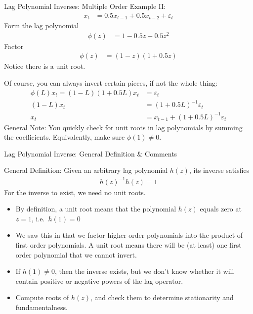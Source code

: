 \documentclass[aspectratio=169, handout]{beamer}
\begin{document}
{\footnotesize
\begin{frame}{Lag Polynomial Inverses: Multiple Order}
Example II:
\begin{align*}
  x_t
  &= 0.5x_{t-1} + 0.5x_{t-2} + \varepsilon_t
\end{align*}
Form the lag polynomial
\begin{align*}
  \phi(z)
  &= 1 - 0.5z -0.5z^2
\end{align*}
\pause
Factor
\begin{align*}
  \phi(z)
  &= (1-z)(1+0.5z)
\end{align*}
Notice there is a unit root.

\pause
Of course, you can always invert certain pieces, if not the whole thing:
\begin{align*}
  \phi(L)x_t
  =
  (1-L)(1+0.5L)
  x_t
  &=
  \varepsilon_t
  \\
  (1-L)x_t &= (1+0.5L)^{-1}\varepsilon_t
  \\
  x_t &= x_{t-1} + (1+0.5L)^{-1}\varepsilon_t
\end{align*}
\alert{General Note}:
You quickly check for unit roots in lag polynomials by summing the
coefficients. Equivalently, make sure $\phi(1)\neq 0$.
\end{frame}
}





{\footnotesize
\begin{frame}{Lag Polynomial Inverse: General Definition \& Comments}

\alert{General Definition}:
Given an arbitrary lag polynomial $h(z)$, its inverse satisfies
\begin{align*}
  h(z)^{-1}h(z) = 1
\end{align*}
For the inverse to exist, we need \alert{no unit roots}.
\begin{itemize}
  \item By definition, a unit root means that the polynomial $h(z)$
    equals zero at $z=1$, i.e.\ $h(1)=0$

  \item We saw this in that we factor higher order polynomials into the
    product of first order polynomials.
    A unit root means there will be (at least) one first order
    polynomial that we cannot invert.

  \item If $h(1)\neq 0$, then the inverse exists, but we don't know
    whether it will contain positive or negative powers of the lag
    operator.

  \item Compute roots of $h(z)$, and check them to determine
    stationarity and fundamentalness.
\end{itemize}
\end{frame}
}
\end{document}
